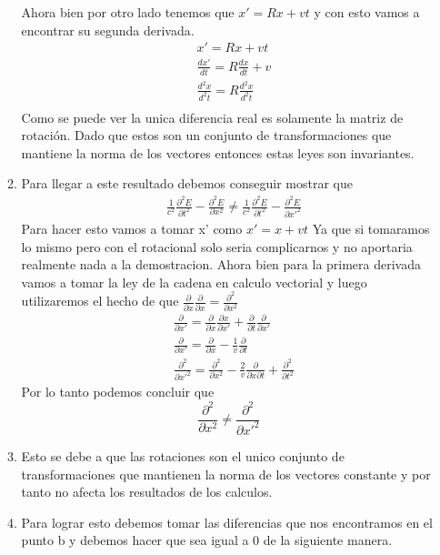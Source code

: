 \documentclass[12pt]{exam}
\begin{document}
\begin{enumerate}
\begin{enumerate}
			Ahora bien por otro lado tenemos que $x' = Rx + vt$ y con esto vamos a encontrar su segunda derivada.
			\begin{align*}
				&x' = Rx + vt\\
				&\frac{dx'}{dt} = R\frac{dx}{dt} + v\\
				&\frac{d^2x}{d^2t} = R\frac{d^2x}{d^2t}\\
			\end{align*}
			Como se puede ver la unica diferencia real es solamente la matriz de rotación. Dado que estos son un conjunto de
			transformaciones que mantiene la norma de los vectores entonces estas leyes son invariantes.
		\item Para llegar a este resultado debemos conseguir mostrar que
			\begin{align*}
				& \frac{1}{c^2}\frac{\partial^2 E}{\partial t^2} - \frac{\partial^2 E}{\partial x^2} \neq  \frac{1}{c^2}\frac{\partial^2 E}{\partial t^2} - \frac{\partial^2 E}{\partial x'^2} 
			\end{align*}
		Para hacer esto vamos a tomar x' como $x'=x+vt$ Ya que si tomaramos lo mismo pero con el rotacional solo seria complicarnos y no aportaria realmente nada a la demostracion. Ahora bien para la primera derivada vamos a tomar la ley de la cadena en calculo vectorial y luego utilizaremos el hecho de que $\frac{\partial}{\partial x} \frac{\partial}{\partial x} = \frac{\partial^2}{\partial x^2}$ 
		\begin{align*}
			&\frac{\partial}{\partial x'} = \frac{\partial}{\partial x}\frac{\partial x}{\partial x'} + \frac{\partial}{\partial t}\frac{\partial}{\partial x'}\\
			&\frac{\partial}{\partial x'} = \frac{\partial}{\partial x} - \frac{1}{v} \frac{\partial}{\partial t}\\
			&\frac{\partial^2}{\partial x'^2} = \frac{\partial^2}{\partial x^2} - \frac{2}{v}\frac{\partial}{\partial x \partial t} + \frac{\partial^2}{\partial t^2}
		\end{align*}
		Por lo tanto podemos concluir que $$\frac{\partial^2}{\partial x^2} \neq \frac{\partial^2}{\partial x'^2}$$
		\item Esto se debe a que las rotaciones son el unico conjunto de transformaciones que mantienen la norma de los vectores
			constante y por tanto no afecta los resultados de los calculos.
		\item Para lograr esto debemos tomar las diferencias que nos encontramos en el punto b y debemos hacer que sea igual a 0
			de la siguiente manera.
			\begin{align*}

\end{align*}
\end{enumerate}
\end{enumerate}
\end{document}
